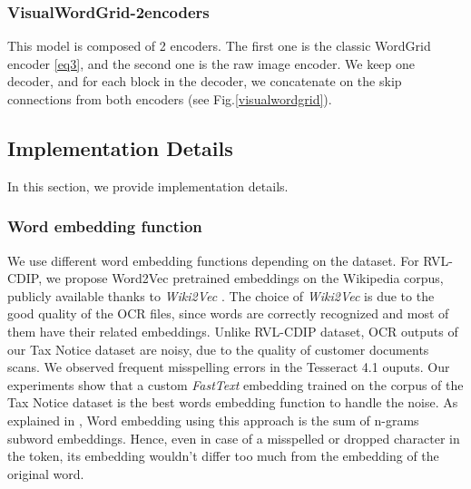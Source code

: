 \documentclass[runningheads]{llncs}
\begin{document}
\subsubsection{VisualWordGrid-2encoders}\hfill

This model is composed of 2 encoders. The first one is the classic WordGrid encoder \eqref{eq3}, and the second one is the raw image encoder. We keep one decoder, and for each block in the decoder, we concatenate on the skip connections from both encoders (see Fig.\ref{visualwordgrid}).

\begin{comment}
\begin{figure*}
 \center
  \texttt{[image: double\_encoder.jpeg]}
  \caption{VisualWordGrid-2encoders pipeline.}
  \label{AAA}
\end{figure*}
\end{comment}

\subsection{Implementation Details}

In this section, we provide implementation details.

\subsubsection{Word embedding function}\hfill

We use different word embedding functions depending on the dataset. For RVL-CDIP, we propose Word2Vec pretrained embeddings on the Wikipedia corpus, publicly available thanks to \textit{Wiki2Vec} \cite{wiki2vec}. The choice of \textit{Wiki2Vec} is due to the good quality of the OCR files, since words are correctly recognized and most of them have their related embeddings. Unlike RVL-CDIP dataset, OCR outputs of our Tax Notice dataset are noisy, due to the quality of customer documents scans. We observed frequent misspelling errors in the Tesseract 4.1 \cite{tesseract} ouputs. Our experiments show that a custom \textit{ FastText} embedding trained on the corpus of the Tax Notice dataset is the best words embedding function to handle the noise. As explained in \cite{fasttext}, Word embedding using this approach is the sum of n-grams subword embeddings. Hence, even in case of a misspelled or  dropped character in the token, its embedding wouldn't differ too much from the embedding of the original word.
\end{document}
